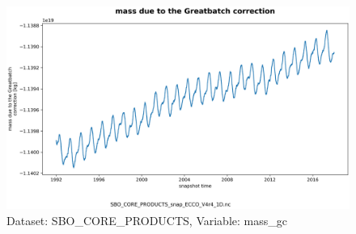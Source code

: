 \begin{figure}[H]
\centering
\includegraphics[scale=0.55]{../images/plots/v4r4/oneD_plots/SBO_Core_Products/mass_gc.png}
\caption{Dataset: SBO\_CORE\_PRODUCTS, Variable: mass\_gc}
\label{tab:table-SBO_CORE_PRODUCTS_mass_gc-Plot}
\end{figure}
\newpage
\pagebreak
